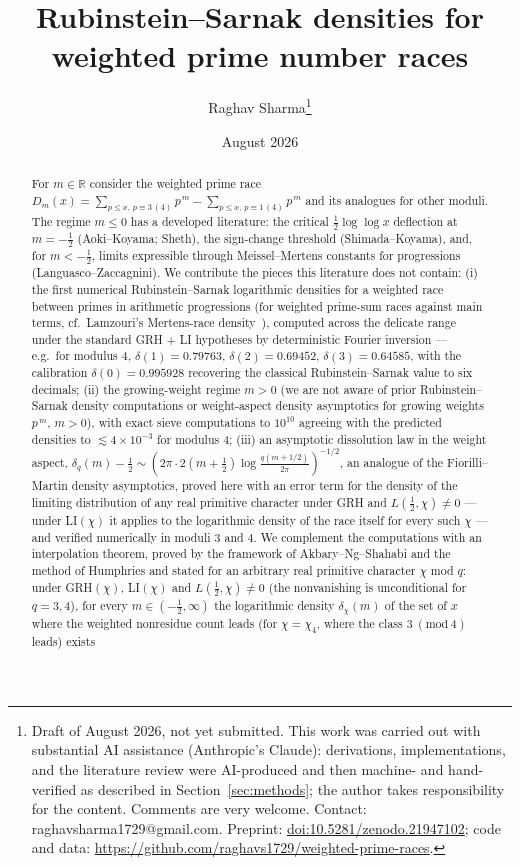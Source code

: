 \documentclass[11pt]{article}
\title{Rubinstein--Sarnak densities for weighted prime number races}
\author{Raghav Sharma\thanks{Draft of August 2026, not yet submitted.
This work was carried out with substantial AI assistance (Anthropic's
Claude): derivations, implementations, and the literature review were
AI-produced and then machine- and hand-verified as described in
Section~\ref{sec:methods}; the author takes responsibility for the
content. Comments are very welcome. Contact: raghavsharma1729@gmail.com.
Preprint: \href{https://doi.org/10.5281/zenodo.21947102}{doi:10.5281/zenodo.21947102};
code and data: \url{https://github.com/raghavs1729/weighted-prime-races}.}}
\date{August 2026}
\newcommand{\loglog}{\log\log}
\begin{document}
\maketitle

\begin{abstract}
For $m\in\mathbb R$ consider the weighted prime race
$D_m(x)=\sum_{p\le x,\,p\equiv 3\,(4)}p^{\,m}-\sum_{p\le x,\,p\equiv
1\,(4)}p^{\,m}$ and its analogues for other moduli. The regime
$m\le 0$ has a developed literature: the critical
$\tfrac12\loglog x$ deflection at $m=-\tfrac12$ (Aoki--Koyama; Sheth),
the sign-change threshold (Shimada--Koyama), and, for $m<-\tfrac12$,
limits expressible through Meissel--Mertens constants for progressions
(Languasco--Zaccagnini). We contribute the pieces this literature does
not contain: (i) the first numerical Rubinstein--Sarnak logarithmic
densities for a weighted race between primes in arithmetic progressions
(for weighted prime-sum races against main terms, cf.\ Lamzouri's
Mertens-race density~\cite{Lam16}), computed across the delicate
range under the standard GRH + LI hypotheses by deterministic Fourier
inversion --- e.g.\ for modulus $4$, $\delta(1)=0.79763$,
$\delta(2)=0.69452$, $\delta(3)=0.64585$, with the calibration
$\delta(0)=0.995928$ recovering the classical Rubinstein--Sarnak value
to six decimals; (ii) the
growing-weight regime $m>0$ (we are not aware of prior
Rubinstein--Sarnak density computations or weight-aspect density
asymptotics for growing weights $p^{\,m}$, $m>0$), with exact sieve
computations to $10^{10}$ agreeing with the predicted densities to
$\lesssim4\times10^{-3}$ for modulus $4$; (iii) an asymptotic dissolution law in the weight
aspect, $\delta_q(m)-\tfrac12\sim(2\pi\cdot
2(m+\tfrac12)\log\tfrac{q(m+1/2)}{2\pi})^{-1/2}$, an analogue of the
Fiorilli--Martin density asymptotics, proved here with an error term
for the density of the limiting distribution of any real primitive
character under GRH and $L(\tfrac12,\chi)\neq0$ --- under LI$(\chi)$
it applies
to the logarithmic density of the race itself for every such $\chi$
--- and verified
numerically in moduli $3$ and $4$. We complement the computations with an interpolation
theorem, proved by the framework of Akbary--Ng--Shahabi and the method
of Humphries and stated for an arbitrary real primitive character
$\chi$ mod $q$: under GRH$(\chi)$, LI$(\chi)$ and
$L(\tfrac12,\chi)\ne0$ (the nonvanishing is unconditional for
$q=3,4$), for every
$m\in(-\tfrac12,\infty)$ the logarithmic density $\delta_\chi(m)$ of
the set of $x$ where the weighted nonresidue count leads (for
$\chi=\chi_4$, where the class $3\ (\mathrm{mod}\ 4)$ leads) exists

\end{abstract}
\end{document}
